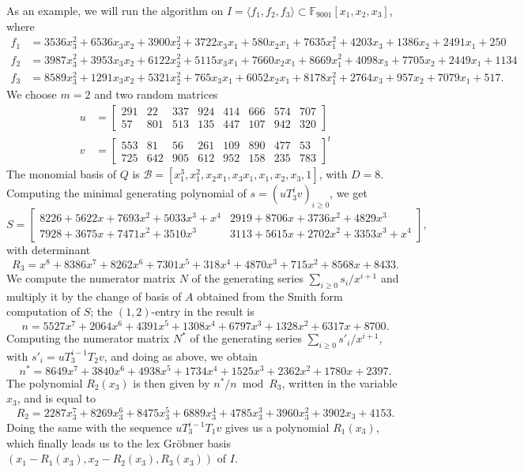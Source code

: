 \documentclass[12pt]{article}
\begin{document}
As an example, we will run the algorithm on $I = \langle f_1, f_2, f_3 \rangle \subset \mathbb{F}_{9001}[x_1,x_2,x_3]$,
where
{\small
\begin{align*}
f_1 &= 3536x_3^2 +6536x_3x_2 + 3900x_2^2 + 3722x_3x_1 + 580x_2x_1 + 7635x_1^2 + 4203x_3 + 1386x_2 + 2491x_1 + 250\\
f_2 &= 3987x_3^2 + 3953x_3x_2 +6122x_2^2 +5115x_3x_1 +7660x_2x_1 +8669x_1^2 + 4098x_3 +7705x_2 + 2449x_1 + 1134\\
f_3 &= 8589x_3^2 + 1291x_3x_2 +5321x_2^2 + 765x_3x_1 +6052x_2x_1 +8178x_1^2 + 2764x_3 + 957x_2 +7079x_1 + 517.
\end{align*}
}%
We choose $m = 2$ and two random matrices
\begin{align*}
u &= \begin{bmatrix}
291&  22& 337& 924& 414& 666& 574& 707\\
57& 801& 513& 135& 447& 107& 942& 320
\end{bmatrix}\\
v &= \begin{bmatrix}
553&  81&  56& 261& 109& 890& 477&  53\\
725& 642& 905& 612& 952& 158& 235& 783
\end{bmatrix} ^ {t}
\end{align*}
The monomial basis of $Q$ is $\mathscr{B}=[x_1^3, x_1^2, x_2x_1, x_3x_1, x_1, x_2, x_3, 1]$, with $D = 8$. 
Computing the minimal generating polynomial of $s=(u T_3^i v)_{i\ge 0}$, we get
$$S= \begin{bmatrix}
8226 + 5622x + 7693x^2 + 5033x^3 + x^4&     2919 + 8706x + 3736x^2 + 4829x^3\\
7928 + 3675x + 7471x^2 + 3510x^3  &        3113 + 5615x + 2702x^2 + 3353x^3 + x^4
\end{bmatrix},$$
with determinant
$$R_3 =x^8 + 8386x^7 + 8262x^6 + 7301x^5 + 318x^4 + 4870x^3 + 715x^2 + 8568x + 8433.$$
We compute the numerator matrix $N$ of the generating series $\sum_{i \ge 0} s_i/x^{i+1}$
and multiply it by the change of basis of $A$ obtained from the Smith form computation of 
$S$; the $(1,2)$-entry in the result is
$$n = 5527x^7 + 2064x^6 + 4391x^5 + 1308x^4 + 6797x^3 + 1328x^2 + 6317x + 8700.$$
Computing the numerator matrix $N^*$ of the generating series $\sum_{i \ge 0} s'_i/x^{i+1}$,
with $s'_i = uT_3^{i-1} T_2 v$, and doing as above, we obtain
$$n^* = 8649x^7 + 3840x^6 + 4938x^5 + 1734x^4 + 1525x^3 + 2362x^2 + 1780x + 2397.$$
The polynomial $R_2(x_3)$ is then given by $n^*/n \bmod R_3$, written in the variable
$x_3$, and
is equal to 
$$R_2 = 2287x_3^7 + 8269x_3^6 + 8475x_3^5 + 6889x_3^4 + 4785x_3^3 + 3960x_3^2 + 3902x_3 + 4153.$$
Doing the same with the sequence $uT_3^{i-1} T_1 v$ gives us a polynomial $R_1(x_3)$,
which finally leads us to the lex Gr\"obner basis $(x_1-R_1(x_3), x_2-R_2(x_3),R_3(x_3))$
of $I$.
\end{document}
